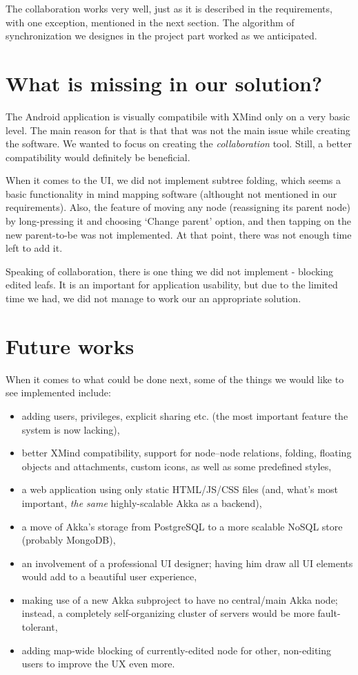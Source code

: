 The collaboration works very well, just as it is described in the requirements, with one exception, mentioned in the next section. The algorithm of synchronization we designes in the project part worked  as we anticipated. 

\section{What is missing in our solution?}
\label{sec:summary-missing}
The Android application is visually compatibile with XMind only on a very basic level. The main reason for that is that that was not the main issue while creating the software. We wanted to focus on creating the \emph{collaboration} tool. Still, a better compatibility would definitely be beneficial. 

When it comes to the UI, we did not implement subtree folding, which seems a basic functionality in mind mapping software (althought not mentioned in our requirements). Also, the feature of moving any node (reassigning its parent node) by long-pressing it and choosing `Change parent' option, and then tapping on the new parent-to-be was not implemented. At that point, there was not enough time left to add it.

Speaking of collaboration, there is one thing we did not implement - blocking edited leafs. It is an important for application usability, but due to the limited time we had, we did not manage to work our an appropriate solution. 

\section{Future works}
\label{sec:summary-future}
When it comes to what could be done next, some of the things we would like to see implemented include:

\begin{itemize}
	\item adding users, privileges, explicit sharing etc. (the most important feature the system is now lacking),
	\item better XMind compatibility, support for node--node relations, folding, floating objects and attachments, custom icons, as well as some predefined styles,
	\item a web application using only static HTML/JS/CSS files (and, what's most important, \emph{the same} highly-scalable Akka as a backend),
	\item a move of Akka's storage from PostgreSQL to a more scalable NoSQL store (probably MongoDB),
	\item an involvement of a professional UI designer; having him draw all UI elements would add to a beautiful user experience,
	\item making use of a new  Akka subproject to have no central/main Akka node; instead, a completely self-organizing cluster of servers would be more fault-tolerant,
	\item adding map-wide blocking of currently-edited node for other, non-editing users to improve the UX even more.
\end{itemize}
